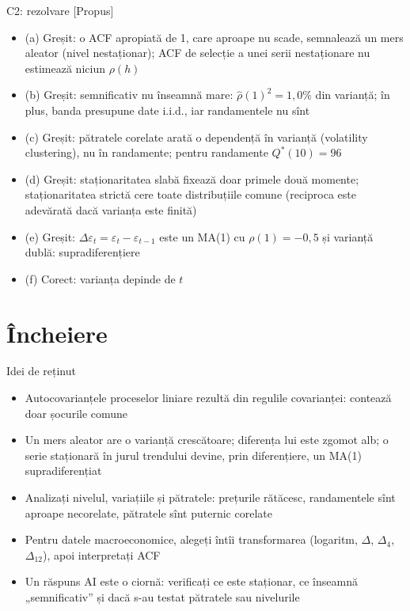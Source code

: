 \ifsolutions
\begin{frame}{C2: rezolvare [Propus]}
\itemsize{\scriptsize}
\begin{itemize}
    \item (a) Greșit: o ACF apropiată de 1, care aproape nu scade, semnalează un mers aleator (nivel nestaționar); ACF de selecție a unei serii nestaționare nu estimează niciun $\rho(h)$
    \item (b) Greșit: semnificativ nu înseamnă mare: $\hat\rho(1)^2 = 1{,}0\%$ din varianță; în plus, banda presupune date i.i.d., iar randamentele nu sînt
    \item (c) Greșit: pătratele corelate arată o dependență în varianță (volatility clustering), nu în randamente; pentru randamente $Q^*(10) = 96$
    \item (d) Greșit: staționaritatea slabă fixează doar primele două momente; staționaritatea strictă cere toate distribuțiile comune (reciproca este adevărată dacă varianța este finită)
    \item (e) Greșit: $\Delta\varepsilon_t = \varepsilon_t - \varepsilon_{t-1}$ este un MA(1) cu $\rho(1) = -0{,}5$ și varianță dublă: supradiferențiere
    \item (f) Corect: varianța depinde de $t$
\end{itemize}
\end{frame}
\fi


\section{Încheiere}

\begin{frame}{Idei de reținut}
\itemsize{\small}
\begin{itemize}
    \item Autocovarianțele proceselor liniare rezultă din regulile covarianței: contează doar șocurile comune
    \item Un mers aleator are o varianță crescătoare; diferența lui este zgomot alb; o serie staționară în jurul trendului devine, prin diferențiere, un MA(1) supradiferențiat
    \item Analizați nivelul, variațiile și pătratele: prețurile rătăcesc, randamentele sînt aproape necorelate, pătratele sînt puternic corelate
    \item Pentru datele macroeconomice, alegeți întîi transformarea (logaritm, $\Delta$, $\Delta_4$, $\Delta_{12}$), apoi interpretați ACF
    \item Un răspuns AI este o ciornă: verificați ce este staționar, ce înseamnă „semnificativ” și dacă s-au testat pătratele sau nivelurile
\end{itemize}
\end{frame}

